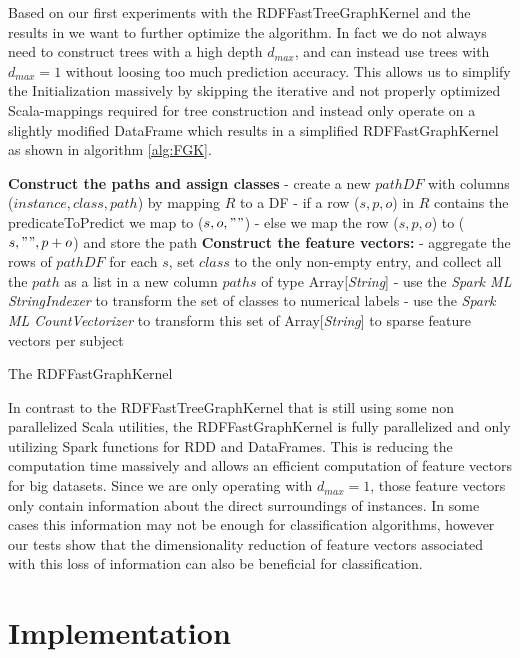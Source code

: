 \documentclass{easychair}
\begin{document}
Based on our first experiments with the RDFFastTreeGraphKernel and the results in \cite{FGK} we want to further optimize the algorithm. In fact we do not always need to construct trees with a high depth $d_{max}$, and can instead use trees with $d_{max}=1$ without loosing too much prediction accuracy. This allows us to simplify the Initialization massively by skipping the iterative and not properly optimized Scala-mappings required for tree construction and instead only operate on a slightly modified DataFrame which results in a simplified RDFFastGraphKernel as shown in algorithm \ref{alg:FGK}.

\begin{algorithm}
 \label{alg:FGK}
 \;

\textbf{Construct the paths and assign classes}\; \Indp
- create a new $pathDF$ with columns ($instance,class,path$) by mapping $R$ to a DF\; \Indp
- if a row ($s,p,o$) in $R$ contains the predicateToPredict we map to ($s,o,""$)\;
- else we map the row ($s,p,o$) to ($s,"",p+o$) and store the path\; \Indm \Indm
 \;
 \textbf{Construct the feature vectors:}\; \Indp
 - aggregate the rows of $pathDF$ for each $s$, set $class$ to the only non-empty entry, and collect all the $path$ as a list in a new column $paths$ of type Array[\textit{String}]\;
 - use the \textit{Spark ML StringIndexer} to transform the set of classes to numerical labels\;
 - use the \textit{Spark ML CountVectorizer} to transform this set of Array[\textit{String}] to sparse feature vectors per subject\;
 \;
\caption{The RDFFastGraphKernel}
\end{algorithm}

In contrast to the RDFFastTreeGraphKernel that is still using some non parallelized Scala utilities, the RDFFastGraphKernel is fully parallelized and only utilizing Spark functions for RDD and DataFrames. This is reducing the computation time massively and allows an efficient computation of feature vectors for big datasets. Since we are only operating with $d_{max}=1$, those feature vectors only contain information about the direct surroundings of instances. In some cases this information may not be enough for classification algorithms, however our tests show that the dimensionality reduction of feature vectors associated with this loss of information can also be beneficial for classification.
\section{Implementation}
\label{sect:Implementation}
\end{document}
